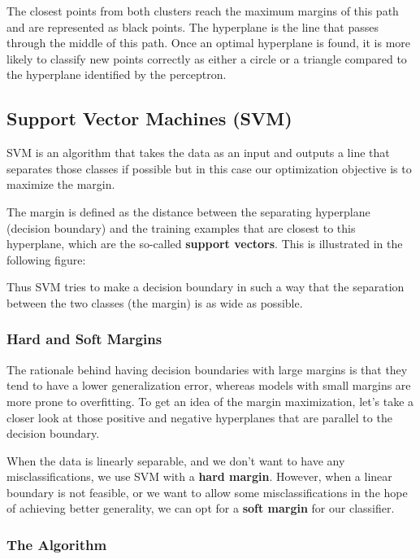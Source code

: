 \documentclass[11pt]{article}
\begin{document}
    

    The closest points from both clusters reach the maximum margins of this
path and are represented as black points. The hyperplane is the line
that passes through the middle of this path. Once an optimal hyperplane
is found, it is more likely to classify new points correctly as either a
circle or a triangle compared to the hyperplane identified by the
perceptron.

    \subsection{Support Vector Machines
(SVM)}\label{support-vector-machines-svm}

    SVM is an algorithm that takes the data as an input and outputs a line
that separates those classes if possible but in this case our
optimization objective is to maximize the margin.

The margin is defined as the distance between the separating hyperplane
(decision boundary) and the training examples that are closest to this
hyperplane, which are the so-called \textbf{support vectors}. This is
illustrated in the following figure:

    

    Thus SVM tries to make a decision boundary in such a way that the
separation between the two classes (the margin) is as wide as possible.

    \subsubsection{Hard and Soft Margins}\label{hard-and-soft-margins}

The rationale behind having decision boundaries with large margins is
that they tend to have a lower generalization error, whereas models with
small margins are more prone to overfitting. To get an idea of the
margin maximization, let's take a closer look at those positive and
negative hyperplanes that are parallel to the decision boundary.

When the data is linearly separable, and we don't want to have any
misclassifications, we use SVM with a \textbf{hard margin}. However,
when a linear boundary is not feasible, or we want to allow some
misclassifications in the hope of achieving better generality, we can
opt for a \textbf{soft margin} for our classifier.

    

    \subsubsection{The Algorithm}\label{the-algorithm}
\end{document}
